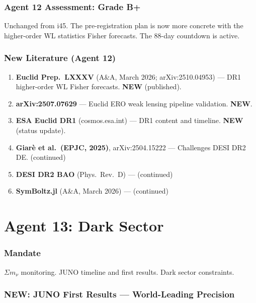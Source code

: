 \documentclass[11pt,a4paper]{article}
\newcommand{\NEW}{\textcolor{dfdblue}{\textbf{NEW}}}
\begin{document}
\section{Agent 12 Assessment: Grade B+}

Unchanged from i45. The pre-registration plan is now more concrete with the higher-order WL statistics Fisher forecasts. The 88-day countdown is active.

\section{New Literature (Agent 12)}

\begin{enumerate}
\item \textbf{Euclid Prep.\ LXXXV} (A\&A, March 2026; arXiv:2510.04953) --- DR1 higher-order WL Fisher forecasts. \NEW{} (published).
\item \textbf{arXiv:2507.07629} --- Euclid ERO weak lensing pipeline validation. \NEW.
\item \textbf{ESA Euclid DR1} (cosmos.esa.int) --- DR1 content and timeline. \NEW{} (status update).
\item \textbf{Giar\`e et al.\ (EPJC, 2025)}, arXiv:2504.15222 --- Challenges DESI DR2 DE. (continued)
\item \textbf{DESI DR2 BAO} (Phys.\ Rev.\ D) --- (continued)
\item \textbf{SymBoltz.jl} (A\&A, March 2026) --- (continued)
\end{enumerate}


\part{Agent 13: Dark Sector}
\label{part:agent13}

\section{Mandate}

$\Sigma m_\nu$ monitoring. JUNO timeline and first results. Dark sector constraints.

\section{\NEW: JUNO First Results --- World-Leading Precision}
\end{document}
